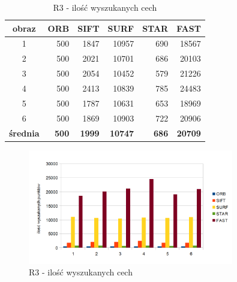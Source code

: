 \begin{table}[htbp]
  \centering
  \caption{R3 - ilość wyszukanych cech}
    \begin{tabular}{|c|r|r|r|r|r|}\hline
    
    obraz & \textbf{ORB} & \textbf{SIFT} & \textbf{SURF} & \textbf{STAR} & \textbf{FAST} \\\hline
    
    1 & 500 & 1847 & 10957 & 690 & 18567 \\
    2 & 500 & 2021 & 10701 & 686 & 20103 \\
    3 & 500 & 2054 & 10452 & 579 & 21226 \\
    4 & 500 & 2413 & 10839 & 785 & 24483 \\
    5 & 500 & 1787 & 10631 & 653 & 18969 \\
    6 & 500 & 1869 & 10903 & 722 & 20906 \\\hline
    \textbf{średnia} & \textbf{500} & \textbf{1999} & \textbf{10747} & \textbf{686} & \textbf{20709} \\
    \hline
    \end{tabular}%
  \label{tab:r3_f1}%
\end{table}%


\begin{figure}
\centering
\includegraphics[width=0.8\textwidth]{pict/slowik/r3/F1.png}
\caption{R3 - ilość wyszukanych cech}
\label{fig:r3_f1}
\end{figure}


